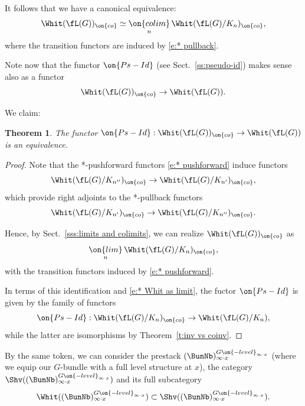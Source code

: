 \documentclass[9pt]{amsart}
\newtheorem{thm}[subsubsection]{Theorem}
\theoremstyle{definition}
\theoremstyle{remark}
\newcommand{\thmref}[1]{Theorem~\ref{#1}}
\newcommand{\secref}[1]{Sect.~\ref{#1}}
\numberwithin{equation}{section}
\begin{document}
\medskip

It follows that we have a canonical equivalence:
\begin{equation} \label{e:Whit as colim}
\Whit(\fL(G))_{\on{co}}\simeq \underset{n}{\on{colim}}\, \Whit(\fL(G)/K_n)_{\on{co}},
\end{equation}
where the transition functors are induced by \eqref{e:* pullback}.

\sssec{}

Note now that the functor $\on{Ps-Id}$ (see \secref{ss:pseudo-id}) makes sense also as a functor
$$\Whit(\fL(G))_{\on{co}}\to \Whit(\fL(G)).$$

We claim:

\begin{thm}  \label{t:inv vs coinv inf}
The functor $\on{Ps-Id}:\Whit(\fL(G))_{\on{co}}\to \Whit(\fL(G))$ is an equivalence.
\end{thm} 

\begin{proof}

Note that the *-pushforward functors \eqref{e:* pushforward} induce functors
$$\Whit(\fL(G)/K_{n''})_{\on{co}}\to \Whit(\fL(G)/K_{n'})_{\on{co}},$$
which provide right adjoints to the *-pullback functors 
$$\Whit(\fL(G)/K_{n'})_{\on{co}}\to \Whit(\fL(G)/K_{n''})_{\on{co}}.$$

Hence, by \secref{sss:limits and colimits}, we can realize $\Whit(\fL(G))_{\on{co}}$
as 
$$\underset{n}{\on{lim}}\, \Whit(\fL(G)/K_n)_{\on{co}},$$
with the transition functors induced by \eqref{e:* pushforward}.

\medskip

In terms of this identification and \eqref{e:* Whit as limit}, the fuctor $\on{Ps-Id}$
is given by the family of functors
$$\on{Ps-Id}: \Whit(\fL(G)/K_n)_{\on{co}}\to \Whit(\fL(G)/K_n),$$
while the latter are isomorphisms by \thmref{t:inv vs coinv}. 

\end{proof}

\sssec{}

By the same token, we can consider the prestack $(\BunNb)^{G\on{-level}_{\infty\cdot x}}_{\infty\cdot x}$
(where we equip our $G$-bundle with a full level structure at $x$),
the category $\Shv((\BunNb)^{G\on{-level}_{\infty\cdot x}}_{\infty\cdot x})$ and its full subcategory
$$\Whit((\BunNb)^{G\on{-level}_{\infty\cdot x}}_{\infty\cdot x})
\subset \Shv((\BunNb)^{G\on{-level}_{\infty\cdot x}}_{\infty\cdot x}).$$

\medskip
\end{document}
